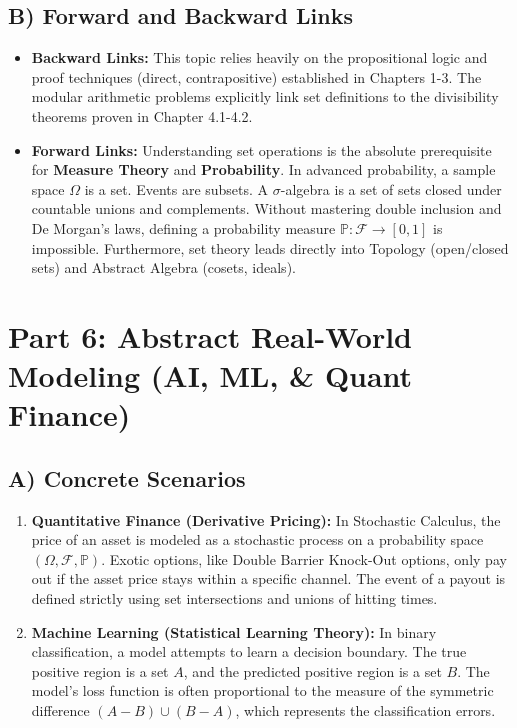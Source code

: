 \documentclass[11pt]{article}
\theoremstyle{definition}
\theoremstyle{remark}
\begin{document}
\subsection{B) Forward and Backward Links}
\begin{itemize}
    \item \textbf{Backward Links:} This topic relies heavily on the propositional logic and proof techniques (direct, contrapositive) established in Chapters 1-3. The modular arithmetic problems explicitly link set definitions to the divisibility theorems proven in Chapter 4.1-4.2.
    \item \textbf{Forward Links:} Understanding set operations is the absolute prerequisite for \textbf{Measure Theory} and \textbf{Probability}. In advanced probability, a sample space $\Omega$ is a set. Events are subsets. A $\sigma$-algebra is a set of sets closed under countable unions and complements. Without mastering double inclusion and De Morgan's laws, defining a probability measure $\mathbb{P}: \mathcal{F} \to [0,1]$ is impossible. Furthermore, set theory leads directly into Topology (open/closed sets) and Abstract Algebra (cosets, ideals).
\end{itemize}

\section{Part 6: Abstract Real-World Modeling (AI, ML, \& Quant Finance)}

\subsection{A) Concrete Scenarios}
\begin{enumerate}
    \item \textbf{Quantitative Finance (Derivative Pricing):} In Stochastic Calculus, the price of an asset is modeled as a stochastic process on a probability space $(\Omega, \mathcal{F}, \mathbb{P})$. Exotic options, like Double Barrier Knock-Out options, only pay out if the asset price stays within a specific channel. The event of a payout is defined strictly using set intersections and unions of hitting times.
    \item \textbf{Machine Learning (Statistical Learning Theory):} In binary classification, a model attempts to learn a decision boundary. The true positive region is a set $A$, and the predicted positive region is a set $B$. The model's loss function is often proportional to the measure of the symmetric difference $(A - B) \cup (B - A)$, which represents the classification errors.
\end{enumerate}
\end{document}
